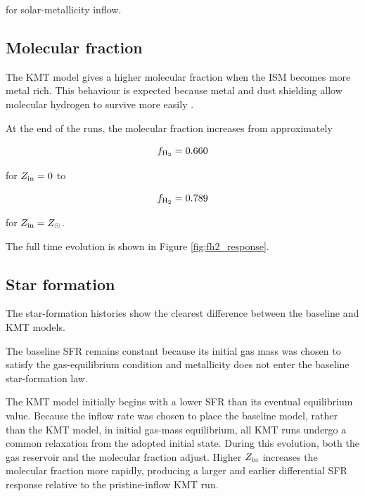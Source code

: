 \documentclass[10pt,a4paper]{article}
\begin{document}
for solar-metallicity inflow.

\subsection{Molecular fraction}

The KMT model gives a higher molecular fraction when the ISM becomes more metal rich. This behaviour is expected because metal and dust shielding allow molecular hydrogen to survive more easily \cite{kmt2009ii,kmt2009sf}.

At the end of the runs, the molecular fraction increases from approximately

\begin{equation}
f_{\rm H_2}=0.660
\end{equation}

for \(Z_{\rm in}=0\) to

\begin{equation}
f_{\rm H_2}=0.789
\end{equation}

for \(Z_{\rm in}=Z_\odot\).

The full time evolution is shown in Figure \ref{fig:fh2_response}.

\subsection{Star formation}

The star-formation histories show the clearest difference between the baseline and KMT models.

The baseline SFR remains constant because its initial gas mass was chosen to satisfy the gas-equilibrium condition and metallicity does not enter the baseline star-formation law.

The KMT model initially begins with a lower SFR than its eventual equilibrium value. Because the inflow rate was chosen to place the baseline model, rather than the KMT model, in initial gas-mass equilibrium, all KMT runs undergo a common relaxation from the adopted initial state. During this evolution, both the gas reservoir and the molecular fraction adjust. Higher \(Z_{\rm in}\) increases the molecular fraction more rapidly, producing a larger and earlier differential SFR response relative to the pristine-inflow KMT run.
\end{document}
